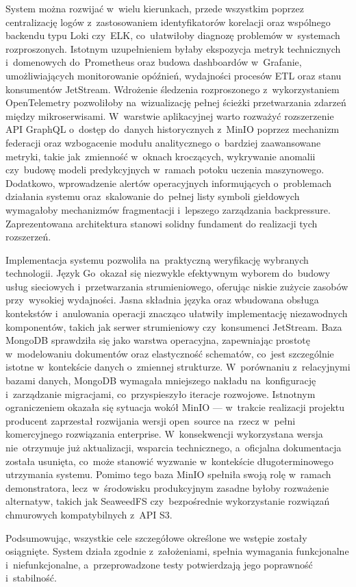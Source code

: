 System można rozwijać w~wielu kierunkach, przede wszystkim poprzez centralizację logów z~zastosowaniem
identyfikatorów korelacji oraz wspólnego backendu typu Loki czy~ELK, co~ułatwiłoby diagnozę problemów w~systemach
rozproszonych.
Istotnym uzupełnieniem byłaby ekspozycja metryk technicznych i~domenowych do~Prometheus oraz budowa dashboardów
w~Grafanie, umożliwiających monitorowanie opóźnień, wydajności procesów ETL oraz stanu konsumentów JetStream.
Wdrożenie śledzenia rozproszonego z~wykorzystaniem OpenTelemetry pozwoliłoby na~wizualizację pełnej ścieżki
przetwarzania zdarzeń między mikroserwisami.
W~warstwie aplikacyjnej warto rozważyć rozszerzenie API GraphQL o~dostęp do~danych historycznych z~MinIO poprzez
mechanizm federacji oraz wzbogacenie modułu analitycznego o~bardziej zaawansowane metryki, takie jak~zmienność
w~oknach kroczących, wykrywanie anomalii czy~budowę modeli predykcyjnych w~ramach potoku uczenia maszynowego.
Dodatkowo, wprowadzenie alertów operacyjnych informujących o~problemach działania systemu oraz~skalowanie do~pełnej
listy symboli giełdowych wymagałoby mechanizmów fragmentacji i~lepszego zarządzania backpressure.
Zaprezentowana architektura stanowi solidny fundament do realizacji tych rozszerzeń.

Implementacja systemu pozwoliła na~praktyczną weryfikację wybranych technologii.
Język Go~okazał się niezwykle efektywnym wyborem do~budowy usług sieciowych i~przetwarzania strumieniowego, oferując
niskie zużycie zasobów przy~wysokiej wydajności.
Jasna składnia języka oraz wbudowana obsługa kontekstów i~anulowania operacji znacząco ułatwiły implementację
niezawodnych komponentów, takich jak serwer strumieniowy czy~konsumenci JetStream.
Baza MongoDB sprawdziła się jako warstwa operacyjna, zapewniając prostotę w~modelowaniu dokumentów oraz elastyczność
schematów, co~jest szczególnie istotne w~kontekście danych o~zmiennej strukturze.
W~porównaniu z~relacyjnymi bazami danych, MongoDB wymagała mniejszego nakładu na~konfigurację i~zarządzanie migracjami,
co~przyspieszyło iteracje rozwojowe.
Istnotnym ograniczeniem okazała się sytuacja wokół MinIO --- w~trakcie realizacji projektu producent zaprzestał
rozwijania wersji open~source na~rzecz w~pełni komercyjnego rozwiązania enterprise.
W~konsekwencji wykorzystana wersja nie~otrzymuje już aktualizacji, wsparcia technicznego, a~oficjalna dokumentacja
została usunięta, co~może stanowić wyzwanie w~kontekście długoterminowego utrzymania systemu.
Pomimo tego baza MinIO spełniła swoją rolę w~ramach demonstratora, lecz~w~środowisku produkcyjnym zasadne byłoby rozważenie
alternatyw, takich jak SeaweedFS czy~bezpośrednie wykorzystanie rozwiązań chmurowych kompatybilnych z~API S3.

Podsumowując, wszystkie cele szczegółowe określone we wstępie zostały osiągnięte.
System działa zgodnie z~założeniami, spełnia wymagania funkcjonalne i~niefunkcjonalne, a~przeprowadzone testy
potwierdzają jego poprawność i~stabilność.

